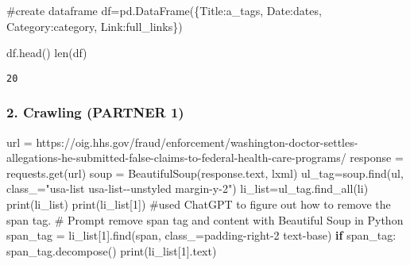\documentclass[
  letterpaper,
  DIV=11,
  numbers=noendperiod]{scrartcl}
\newenvironment{Shaded}{\begin{snugshade}}{\end{snugshade}}
\newcommand{\BuiltInTok}[1]{\textcolor[rgb]{0.00,0.23,0.31}{#1}}
\newcommand{\CommentTok}[1]{\textcolor[rgb]{0.37,0.37,0.37}{#1}}
\newcommand{\ControlFlowTok}[1]{\textcolor[rgb]{0.00,0.23,0.31}{\textbf{#1}}}
\newcommand{\DecValTok}[1]{\textcolor[rgb]{0.68,0.00,0.00}{#1}}
\newcommand{\NormalTok}[1]{\textcolor[rgb]{0.00,0.23,0.31}{#1}}
\newcommand{\OperatorTok}[1]{\textcolor[rgb]{0.37,0.37,0.37}{#1}}
\newcommand{\StringTok}[1]{\textcolor[rgb]{0.13,0.47,0.30}{#1}}
\begin{document}
\begin{Shaded}
\begin{Highlighting}[]
\CommentTok{\#create dataframe}
\NormalTok{df}\OperatorTok{=}\NormalTok{pd.DataFrame(\{}\StringTok{\textquotesingle{}Title\textquotesingle{}}\NormalTok{:a\_tags, }\StringTok{\textquotesingle{}Date\textquotesingle{}}\NormalTok{:dates, }\StringTok{\textquotesingle{}Category\textquotesingle{}}\NormalTok{:category, }\StringTok{\textquotesingle{}Link\textquotesingle{}}\NormalTok{:full\_links\})}

\NormalTok{df.head()}
\BuiltInTok{len}\NormalTok{(df)}
\end{Highlighting}
\end{Shaded}

\begin{verbatim}
20
\end{verbatim}

\subsubsection{2. Crawling (PARTNER 1)}\label{crawling-partner-1}

\begin{Shaded}
\begin{Highlighting}[]
\NormalTok{url }\OperatorTok{=} \StringTok{\textquotesingle{}https://oig.hhs.gov/fraud/enforcement/washington{-}doctor{-}settles{-}allegations{-}he{-}submitted{-}false{-}claims{-}to{-}federal{-}health{-}care{-}programs/\textquotesingle{}}
\NormalTok{response }\OperatorTok{=}\NormalTok{ requests.get(url)}
\NormalTok{soup }\OperatorTok{=}\NormalTok{ BeautifulSoup(response.text, }\StringTok{\textquotesingle{}lxml\textquotesingle{}}\NormalTok{)}
\NormalTok{ul\_tag}\OperatorTok{=}\NormalTok{soup.find(}\StringTok{\textquotesingle{}ul\textquotesingle{}}\NormalTok{, class\_}\OperatorTok{=}\StringTok{"usa{-}list usa{-}list{-}{-}unstyled margin{-}y{-}2"}\NormalTok{)}
\NormalTok{li\_list}\OperatorTok{=}\NormalTok{ul\_tag.find\_all(}\StringTok{\textquotesingle{}li\textquotesingle{}}\NormalTok{)}
\BuiltInTok{print}\NormalTok{(li\_list)}
\BuiltInTok{print}\NormalTok{(li\_list[}\DecValTok{1}\NormalTok{])}
\CommentTok{\#used ChatGPT to figure out how to remove the span tag. }
\CommentTok{\# Prompt remove span tag and content with Beautiful Soup in Python }
\NormalTok{span\_tag }\OperatorTok{=}\NormalTok{ li\_list[}\DecValTok{1}\NormalTok{].find(}\StringTok{\textquotesingle{}span\textquotesingle{}}\NormalTok{, class\_}\OperatorTok{=}\StringTok{\textquotesingle{}padding{-}right{-}2 text{-}base\textquotesingle{}}\NormalTok{)}
\ControlFlowTok{if}\NormalTok{ span\_tag:}
\NormalTok{    span\_tag.decompose()}
\BuiltInTok{print}\NormalTok{(li\_list[}\DecValTok{1}\NormalTok{].text)}
\end{Highlighting}
\end{Shaded}
\end{document}
